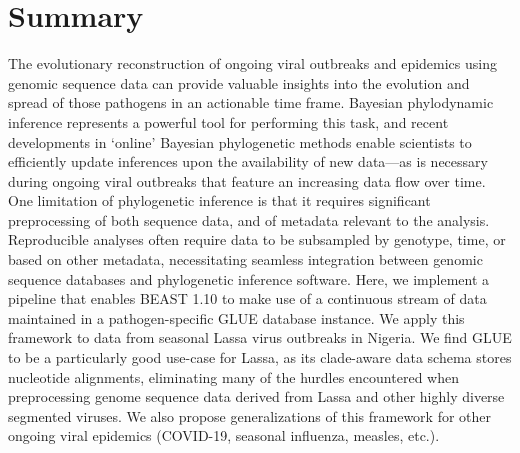 \chapter{Summary}                                 \label{ch:summary}

The evolutionary reconstruction of ongoing viral outbreaks and epidemics using genomic sequence data can provide valuable insights into the evolution and spread of those pathogens in an actionable time frame.
Bayesian phylodynamic inference represents a powerful tool for performing this task, and recent developments in ‘online’ Bayesian phylogenetic methods enable scientists to efficiently update inferences upon the availability of new data—as is necessary during ongoing viral outbreaks that feature an increasing data flow over time.
One limitation of phylogenetic inference is that it requires significant preprocessing of both sequence data, and of metadata relevant to the analysis.
Reproducible analyses often require data to be subsampled by genotype, time, or based on other metadata, necessitating seamless integration between genomic sequence databases and phylogenetic inference software.
Here, we implement a pipeline that enables BEAST 1.10 to make use of a continuous stream of data maintained in a pathogen-specific GLUE database instance.
We apply this framework to data from seasonal Lassa virus outbreaks in Nigeria.
We find GLUE to be a particularly good use-case for Lassa, as its clade-aware data schema stores nucleotide alignments, eliminating many of the hurdles encountered when preprocessing genome sequence data derived from  Lassa and other highly diverse segmented viruses.
We also propose generalizations of this framework for other ongoing viral epidemics (COVID-19, seasonal influenza, measles, etc.).


\cleardoublepage

